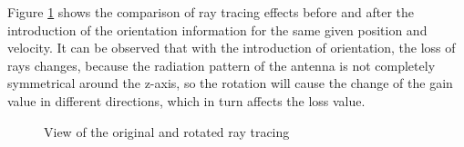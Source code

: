 \documentclass[12pt,DIV14,BCOR12mm,a4paper,footinclude=false,headinclude,parskip=half-,twoside,openright,cleardoublepage=empty,toc=index,bibliography=totoc,listof=totoc]{scrreprt}
\numberwithin{equation}{chapter}
\begin{document}
Figure \ref{view of the default and orientated ray tracing} shows the comparison of ray tracing effects before and after the introduction of the orientation information for the same given position and velocity. It can be observed that with the introduction of orientation, the loss of rays changes, because the radiation pattern of the antenna is not completely symmetrical around the z-axis, so the rotation will cause the change of the gain value in different directions, which in turn affects the loss value.

\begin{figure}[!htb]
    \centering
    \begin{subfigure}{0.45\textwidth}
        \centering
    \end{subfigure}
    \begin{subfigure}{0.45\textwidth}
        \centering
    \end{subfigure}
    \caption{View of the original and rotated ray tracing}
    \label{view of the default and orientated ray tracing}
\end{figure}
\end{document}
